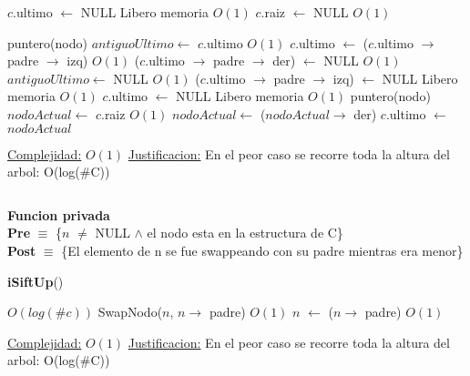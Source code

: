 \begin{Algoritmos}
\begin{algorithm}[H]
\begin{algorithmic}[1]
        \State $c$.ultimo $\gets$ NULL \Comment Libero memoria $O(1)$
        \State $c$.raiz $\gets$ NULL \Comment $O(1)$
    \Else

        \State puntero(nodo) $antiguoUltimo \gets$ $c$.ultimo \Comment $O(1)$
        \State $c$.ultimo $\gets$ ($c$.ultimo $\to$ padre $\to$ izq) \Comment $O(1)$
        \State ($c$.ultimo $\to$ padre $\to$ der) $\gets$ NULL \Comment $O(1)$
        \State $antiguoUltimo \gets$ NULL \Comment $O(1)$
    \Else
            \State ($c$.ultimo $\to$ padre $\to$ izq) $\gets$ NULL \Comment Libero memoria $O(1)$
            \State $c$.ultimo $\gets$ NULL \Comment Libero memoria $O(1)$
            \State puntero(nodo) $nodoActual \gets$ $c$.raiz \Comment $O(1)$
                $nodoActual \gets$ ($nodoActual \to$ der)
            \EndWhile
            \State $c$.ultimo $\gets$ $nodoActual$
        \Else

        \EndIf


    \EndIf

    \EndIf

    \medskip
    \Statex \underline{Complejidad:} $O(1)$
    \Statex \underline{Justificacion:} En el peor caso se recorre toda la altura del arbol: O(log($\#$C))
\end{algorithmic}
\end{algorithm}

$ $\newline

\textbf{Funcion privada}\\
\textbf{Pre} $\equiv$ \{$n$ $\neq$ NULL $\land$ el nodo esta en la estructura de C\}\\%
\textbf{Post} $\equiv$ \{El elemento de n se fue swappeando con su padre mientras era menor\}%
\begin{algorithm}[H]
{\textbf{iSiftUp}()}
\begin{algorithmic}[1]

     \Comment $O(log(\#c))$
        \State SwapNodo($n$, $n \to$ padre) \Comment $O(1)$
        \State $n$ $\gets$ ($n \to$ padre) \Comment $O(1)$
    \EndWhile

    \medskip
    \Statex \underline{Complejidad:} $O(1)$
    \Statex \underline{Justificacion:} En el peor caso se recorre toda la altura del arbol: O(log($\#$C))
\end{algorithmic}
\end{algorithm}




\end{Algoritmos}

